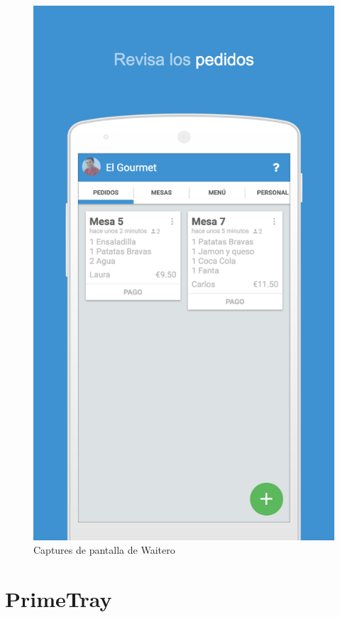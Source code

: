 \begin{figure}[H]
\includegraphics[scale=0.20]{Figures/waitero-3.png}
\caption{Captures de pantalla de Waitero}
\end{figure}




\section{PrimeTray}

